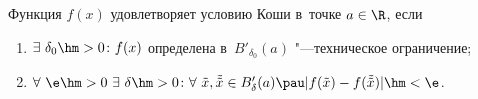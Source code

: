 
    Функция $f(x)$ удовлетворяет условию Коши в~точке $a\in\R$, если

    \begin{enumerate}
        \item $\exists\  \delta_0\hm>0\colon f(x)$ определена в~$B'_{\delta_0}(a)$ "---техническое ограничение;

        \item $\forall\ \e\hm>0\ \exists\ \delta\hm>0\colon\forall\  \tilde{x},\tilde{\tilde {x}}\in B'_\delta(a)\pau |f(\tilde x)-f(\tilde{\tilde x})|\hm<\e$.
    \end{enumerate}
